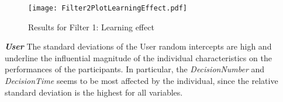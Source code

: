 \begin{figure}[H] %
\begin{center}
\texttt{[image: Filter2PlotLearningEffect.pdf]}  
  \caption[Results for Filter 1: Learning effect]{Results for Filter 1: Learning effect\footnotemark}
    \label{fig:Results for Filter 1: Learning effect} 
\end{center}
\end{figure}

\textbf{\textit{User} } The standard deviations of the User random intercepts are high and underline the influential magnitude of the individual characteristics on the performances of the participants. In particular, the \textit{DecisionNumber} and \textit{DecisionTime} seems to be most affected by the individual, since the relative standard deviation is the highest for all variables. 

